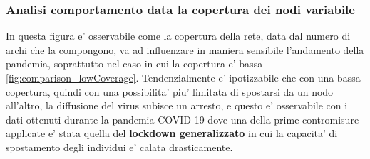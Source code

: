 \subsubsection{Analisi comportamento data la copertura dei nodi variabile}
In questa figura e' osservabile come la copertura della rete, data dal numero di archi che la compongono,
va ad influenzare in maniera sensibile l'andamento della pandemia, soprattutto nel caso in cui la copertura e' 
bassa \ref{fig:comparison_lowCoverage}. Tendenzialmente e' ipotizzabile che con una bassa copertura, quindi 
con una possibilita' piu' limitata di spostarsi da un nodo all'altro, la diffusione del virus subisce un arresto, 
e questo e' osservabile con i dati ottenuti durante la pandemia COVID-19 dove una della prime contromisure applicate 
e' stata quella del \textbf{lockdown generalizzato} in cui la capacita' di spostamento degli individui 
e' calata drasticamente.

